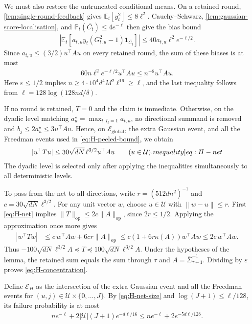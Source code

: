 \documentclass[12pt,cleveref]{jmlr}
\renewenvironment{proof}[1][\proofname]
{\par\noindent{\bfseries\upshape #1\ }}
{\jmlrQED}
\newcommand{\ineqlabel}[1]{\label[inequality]{#1}}
\newcommand{\E}{\mathbb E}
\newcommand{\Pp}{\mathbb P}
\newcommand{\op}{\mathrm{op}}
\newcommand{\1}{\mathbf 1}
\newcommand{\eps}{\varepsilon}
\newcommand{\norm}[1]{\left\lVert #1\right\rVert}
\begin{document}
\begin{proof}
    We must also restore the untruncated conditional means. On a
    retained round, \cref{lem:single-round-feedback} gives
    $\E_t[y_t^2]\leq8\ell^2$.
    Cauchy--Schwarz, \cref{lem:gaussian-score-localisation}, and
    $\Pp_t(\overline{C_t})\leq4e^{-\ell}$ then give the bias bound
    \begin{align}
        \left|\E_t[a_{t,u}y_t(G_{t,u}^2-1)\1_{\overline{C_t}}]\right|
        \leq40a_{t,u}\ell^2 e^{-\ell/2}.
    \end{align}
    Since $a_{t,u}\leq(3/2)u^\top Au$ on every retained round, the sum
    of these biases is at most
    \begin{align}
        60n\ell^2e^{-\ell/2}u^\top Au\leq n^{-8}u^\top Au.
    \end{align}
    Here $\eps\leq1/2$ implies
    $n\geq4\cdot10^4d^4M^2\ell^{16}\geq\ell$, and the last inequality
    follows from $\ell=128\log(128nd/\delta)$.

    If no round is retained, $T=0$ and the claim is immediate.
    Otherwise, on the dyadic level matching
    $a_u^\star=\max_{t:I_t=1}a_{t,u}$,
    no directional summand is removed and
    $b_j\leq2a_u^\star\leq3u^\top Au$. Hence, on
    $\mathcal E_{\mathrm{global}}$, the extra Gaussian event, and all
    the Freedman events used in \cref{eq:H-peeled-bound}, we obtain
    \begin{align}
        |u^\top Tu|
        \leq30\sqrt{dN}\,\ell^{3/2}u^\top Au
        \qquad(u\in\mathcal U).
        \ineqlabel{eq:H-net}
    \end{align}
    The dyadic level is selected only after applying the inequalities
    simultaneously to all deterministic levels.

    To pass from the net to all directions, write
    $r=(512dn^2)^{-1}$ and $c=30\sqrt{dN}\ell^{3/2}$.
    For any unit vector $w$, choose $u\in\mathcal U$ with
    $\norm{w-u}\leq r$. First \cref{eq:H-net} implies
    $\|T\|_{\op}\leq2c\|A\|_{\op}$, since $2r\leq1/2$.
    Applying the approximation once more gives
    \begin{align}
        |w^\top Tw|
        & \leq c\,w^\top Aw+6cr\|A\|_{\op}
        \leq c(1+6r\kappa(A))w^\top Aw
        \leq2c\,w^\top Aw.
    \end{align}
    Thus $-100\sqrt{dN}\ell^{3/2}A\preceq T
    \preceq100\sqrt{dN}\ell^{3/2}A$. Under the hypotheses of the
    lemma, the retained sum equals the sum through $\tau$ and
    $A=\bar{\Sigma}_{\tau+1}^{-1}$. Dividing by $\eps$ proves
    \cref{eq:H-concentration}.

    Define $\mathcal E_H$ as the intersection of the extra Gaussian
    event and all the Freedman events for $(u,j)\in\mathcal U\times
    \{0,\ldots,J\}$. By \cref{eq:H-net-size} and
    $\log(J+1)\leq\ell/128$, its failure probability is at most
    \begin{align}
        ne^{-\ell}+2|\mathcal U|(J+1)e^{-d\ell/16}
        \leq ne^{-\ell}+2e^{-5d\ell/128}.
    \end{align}
\end{proof}
\end{document}
